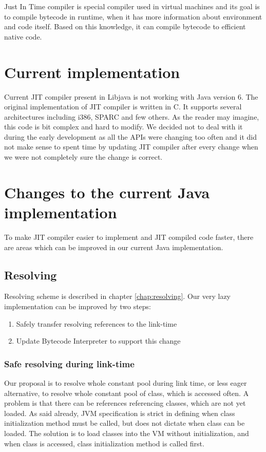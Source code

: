 \documentclass[11pt,twoside,a4paper]{book}
\newcommand{\libjava}{{Libjava}}
\begin{document}
Just In Time compiler is special compiler used in virtual machines and its goal is to compile bytecode in runtime, when it has more information about environment and code itself.
Based on this knowledge, it can compile bytecode to efficient native code.

\section{Current implementation}

Current JIT compiler present in \libjava{} is not working with Java version 6. The original implementation of JIT compiler
is written in C. It supports several architectures including i386, SPARC and few others. As the reader may imagine,
this code is bit complex and hard to modify. We decided not to deal with it during the early development as all the 
APIs were changing too often and it did not make sense to spent time by updating JIT compiler after every change
when we were not completely sure the change is correct. 

\section{Changes to the current Java implementation}

To make JIT compiler easier to implement and JIT compiled code faster, there are areas which can be improved in our 
current Java implementation.

\subsection{Resolving}
\label{sec:changed-resolving}

Resolving scheme is described in chapter \ref{chap:resolving}. 
Our very lazy implementation can be improved by two steps:

\begin{enumerate}
	\item Safely transfer resolving references to the link-time
	\item Update Bytecode Interpreter to support this change 
\end{enumerate}

\subsubsection{Safe resolving during link-time}

Our proposal is to resolve whole constant pool during link time, or less eager alternative, to resolve whole constant pool of class, which is accessed often.
A problem is that there can be references referencing classes, which are not yet loaded.
As said already, JVM specification is strict in defining when class initialization method must be called, but does not dictate when class can be loaded.
The solution is to load classes into the VM without initialization, and when class is accessed, class initialization method is called first.
\end{document}
